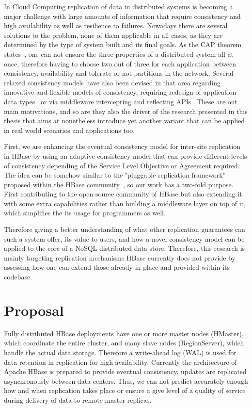 In Cloud Computing replication of data in distributed systems is becoming a major challenge with large amounts of information that require consistency and high availability as well as resilience to failures. Nowadays there are several solutions to the problem, none of them applicable in all cases, as they are determined by the type of system built and its final goals. As the CAP theorem states~\cite{Brewer:2002}, one can not ensure the three properties of a distributed system all at once, therefore having to choose two out of three for each application between consistency, availability and tolerate or not partitions in the network. Several relaxed consistency models have also been devised in that area regarding innovative and flexible models of consistency, requiring redesign of application data types~\cite{Saphiro:2010} or via middleware intercepting and reflecting APIs~\cite{Vfc3:2012} These are out main motivations, and so are they also the driver of the research presented in this thesis that aims at nonetheless introduce yet another variant that can be applied in real world scenarios and applications too.

First, we are enhancing the eventual consistency model for inter-site replication in HBase by using an adaptive consistency model that can provide different levels of consistency depending of the Service Level Objective or Agreement required. The idea can be somehow similar to the "pluggable replication framework" proposed within the HBase community~\cite{JIRA-1}, so our work has a two-fold purpose. First contributing to the open source community of HBase but also extending it with some extra capabilities rather than building a middleware layer on top of it, which simplifies the its usage for programmers as well.

Therefore giving a better understanding of what other replication guarantees can such a system offer, its value to users, and how a novel consistency model can be applied to the core of a NoSQL distributed data store. Therefore, this research is mainly targeting replication mechanisms HBase currently does not provide by assessing how one can extend those already in place and provided within its codebase.



\section{Proposal}
Fully distributed HBase deployments have one or more master nodes (HMaster), which coordinate the entire cluster, and many slave nodes (RegionServer), which handle the actual data storage.  Therefore a write-ahead log (WAL) is used for data retention in replication for high availability. Currently the architecture of Apache HBase is prepared to provide eventual consistency, updates are replicated asynchronously between data centers. Thus, we can not predict accurately enough how and when replication takes place or ensure a give level of a quality of service during delivery of data to remote master replicas.

